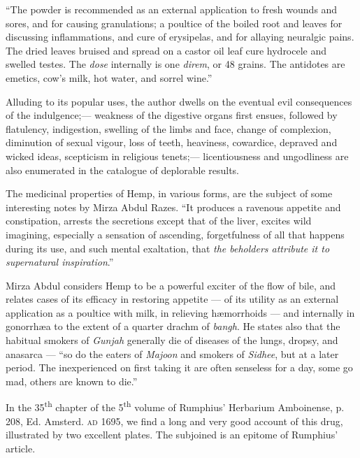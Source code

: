 \documentclass[a4paper, 11pt, oneside, polutonikogreek, english]{article}
\begin{document}
``The powder is recommended as an external application to fresh wounds and sores, and for causing granulations; a poultice of the boiled root and leaves for discussing inflammations, and cure of erysipelas, and for allaying neuralgic pains. The dried leaves bruised and spread on a castor oil leaf cure hydrocele and swelled testes. The \emph{dose} internally is one \emph{direm}, or 48 grains. The antidotes are emetics, cow's milk, hot water, and sorrel wine.''

Alluding to its popular uses, the author dwells on the eventual evil consequences of the indulgence;--- weakness of the digestive organs first ensues, followed by flatulency, indigestion, swelling of the limbs and face, change of complexion, diminution of sexual vigour, loss of teeth, heaviness, cowardice, depraved and wicked ideas, scepticism in religious tenets;--- licentiousness and ungodliness are also enumerated in the catalogue of deplorable results.

The medicinal properties of Hemp, in various forms, are the subject of some interesting notes by Mirza Abdul Razes. ``It produces a ravenous appetite and constipation, arrests the secretions except that of the liver, excites wild imagining, especially a sensation of ascending, forgetfulness of all that happens during its use, and such mental exaltation, that \emph{the beholders attribute it to supernatural inspiration}.''

Mirza Abdul considers Hemp to be a powerful exciter of the flow of bile, and relates cases of its efficacy in restoring appetite --- of its utility as an external application as a poultice with milk, in relieving hæmorrhoids --- and internally in gonorrhæa to the extent of a quarter drachm of \emph{bangh}. He states also that the habitual smokers of \emph{Gunjah} generally die of diseases of the lungs, dropsy, and anasarca --- ``so do the eaters of \emph{Majoon} and smokers of \emph{Sidhee}, but at a later period. The inexperienced on first taking it are often senseless for a day, some go mad, others are known to die.''

In the 35\textsuperscript{th} chapter of the 5\textsuperscript{th} volume of Rumphius' Herbarium Amboinense, p. 208, Ed. Amsterd. \textsc{ad} 1695, we find a long and very good account of this drug, illustrated by two excellent plates. The subjoined is an epitome of Rumphius' article.
\end{document}
